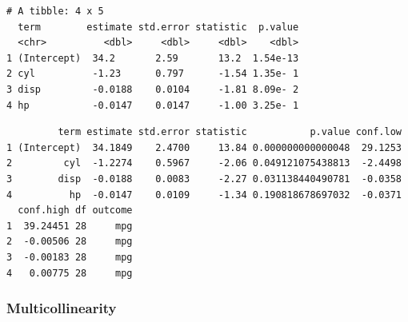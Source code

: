\documentclass[]{book}
\newenvironment{Shaded}{\begin{snugshade}}{\end{snugshade}}
\newcommand{\CommentTok}[1]{\textcolor[rgb]{0.56,0.35,0.01}{\textit{#1}}}
\newcommand{\KeywordTok}[1]{\textcolor[rgb]{0.13,0.29,0.53}{\textbf{#1}}}
\newcommand{\NormalTok}[1]{#1}
\newcommand{\OperatorTok}[1]{\textcolor[rgb]{0.81,0.36,0.00}{\textbf{#1}}}
\newcommand{\StringTok}[1]{\textcolor[rgb]{0.31,0.60,0.02}{#1}}
\begin{document}
\begin{Shaded}
\end{Shaded}

\begin{verbatim}
# A tibble: 4 x 5
  term        estimate std.error statistic  p.value
  <chr>          <dbl>     <dbl>     <dbl>    <dbl>
1 (Intercept)  34.2       2.59       13.2  1.54e-13
2 cyl          -1.23      0.797      -1.54 1.35e- 1
3 disp         -0.0188    0.0104     -1.81 8.09e- 2
4 hp           -0.0147    0.0147     -1.00 3.25e- 1
\end{verbatim}

\begin{Shaded}
\end{Shaded}

\begin{verbatim}
         term estimate std.error statistic           p.value conf.low
1 (Intercept)  34.1849    2.4700     13.84 0.000000000000048  29.1253
2         cyl  -1.2274    0.5967     -2.06 0.049121075438813  -2.4498
3        disp  -0.0188    0.0083     -2.27 0.031138440490781  -0.0358
4          hp  -0.0147    0.0109     -1.34 0.190818678697032  -0.0371
  conf.high df outcome
1  39.24451 28     mpg
2  -0.00506 28     mpg
3  -0.00183 28     mpg
4   0.00775 28     mpg
\end{verbatim}

\hypertarget{multicollinearity-1}{%
\subsubsection{Multicollinearity}\label{multicollinearity-1}}
\end{document}
